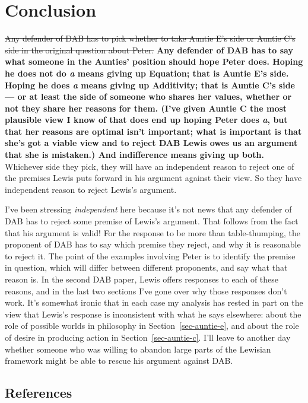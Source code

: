 \documentclass[
  11pt,
  letterpaper,
  DIV=11,
  numbers=noendperiod,
  twoside]{scrartcl}
\begin{document}
\section{Conclusion}\label{sec-conclusion}

\sout{Any defender of DAB has to pick whether to take Auntie E's side or
Auntie C's side in the original question about Peter.}
{\bfseries\boldmath{}Any defender of DAB has to say what someone in the
Aunties' position should hope Peter does. Hoping he does not do \emph{a}
means giving up \textbf{Equation}; that is Auntie E's side. Hoping he
does \emph{a} means giving up \textbf{Additivity}; that is Auntie C's
side --- or at least the side of someone who shares her values, whether
or not they share her reasons for them. (I've given Auntie C the most
plausible view I know of that does end up hoping Peter does \emph{a},
but that her reasons are optimal isn't important; what is important is
that she's got a viable view and to reject DAB Lewis owes us an argument
that she is mistaken.) And indifference means giving up both.} Whichever
side they pick, they will have an independent reason to reject one of
the premises Lewis puts forward in his argument against their view. So
they have independent reason to reject Lewis's argument.

I've been stressing \emph{independent} here because it's not news that
any defender of DAB has to reject some premise of Lewis's argument. That
follows from the fact that his argument is valid! For the response to be
more than table-thumping, the proponent of DAB has to say which premise
they reject, and why it is reasonable to reject it. The point of the
examples involving Peter is to identify the premise in question, which
will differ between different proponents, and say what that reason is.
In the second DAB paper, Lewis offers responses to each of these
reasons, and in the last two sections I've gone over why those responses
don't work. It's somewhat ironic that in each case my analysis has
rested in part on the view that Lewis's response is inconsistent with
what he says elsewhere: about the role of possible worlds in philosophy
in Section~\ref{sec-auntie-e}, and about the role of desire in producing
action in Section~\ref{sec-auntie-c}. I'll leave to another day whether
someone who was willing to abandon large parts of the Lewisian framework
might be able to rescue his argument against DAB.

\subsection*{References}\label{references}
\end{document}
